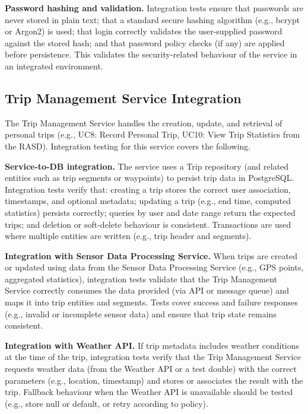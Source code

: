 \textbf{Password hashing and validation.} Integration tests ensure that passwords are never stored in plain text; that a standard secure hashing algorithm (e.g., bcrypt or Argon2) is used; that login correctly validates the user-supplied password against the stored hash; and that password policy checks (if any) are applied before persistence. This validates the security-related behaviour of the service in an integrated environment.

\subsection{Trip Management Service Integration}
\label{subsec:trip_management_service_integration}%

The Trip Management Service handles the creation, update, and retrieval of personal trips (e.g., UC8: Record Personal Trip, UC10: View Trip Statistics from the RASD). Integration testing for this service covers the following.

\textbf{Service-to-DB integration.} The service uses a Trip repository (and related entities such as trip segments or waypoints) to persist trip data in PostgreSQL. Integration tests verify that: creating a trip stores the correct user association, timestamps, and optional metadata; updating a trip (e.g., end time, computed statistics) persists correctly; queries by user and date range return the expected trips; and deletion or soft-delete behaviour is consistent. Transactions are used where multiple entities are written (e.g., trip header and segments).

\textbf{Integration with Sensor Data Processing Service.} When trips are created or updated using data from the Sensor Data Processing Service (e.g., GPS points, aggregated statistics), integration tests validate that the Trip Management Service correctly consumes the data provided (via API or message queue) and maps it into trip entities and segments. Tests cover success and failure responses (e.g., invalid or incomplete sensor data) and ensure that trip state remains consistent.

\textbf{Integration with Weather API.} If trip metadata includes weather conditions at the time of the trip, integration tests verify that the Trip Management Service requests weather data (from the Weather API or a test double) with the correct parameters (e.g., location, timestamp) and stores or associates the result with the trip. Fallback behaviour when the Weather API is unavailable should be tested (e.g., store null or default, or retry according to policy).

